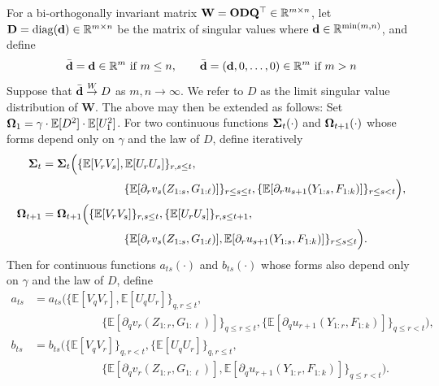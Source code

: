 \documentclass[10pt,reqno]{amsart}
\def\W{\mathbf{W}}
\def\E{\mathbb{E}}
\def\R{\mathbb{R}}
\def\diag{\operatorname{diag}}
\def\toW{\overset{W}{\to}}
\def\bW{{\mathbf{W}}}
\begin{document}
For a bi-orthogonally invariant matrix $\W=\bO\bD\bQ^\top \in \R^{m
\times n}$, let $\bD=\diag(\bd) \in \R^{m \times n}$ be the matrix of singular
values where $\bd \in \R^{\min(m,n)}$, and define
\begin{equation}\label{eq:bard}
\bar{\bd}=\bd \in \R^m \text{ if } m \leq n,
\qquad \bar{\bd}=(\bd,0,\ldots,0) \in \R^m \text{ if } m>n
\end{equation}
Suppose that $\bar\bd \toW D$ as $m,n \to \infty$.
We refer to $D$ as the limit singular value distribution of $\bW$.
The above may then be extended as follows: Set $\bOmega_1=\gamma
\cdot \E[D^2] \cdot \E[U_1^2]$. For two continuous functions $\bm{\Sigma}_t(\cdot)$
and $\bm{\Omega}_{t+1}(\cdot)$ whose forms depend only on $\gamma$ and the law of $D$,
define iteratively
\begin{subequations}\label{eq:rectorthobSigma}
\begin{align}
\bSigma_t&=\bSigma_t\Big(\{\E[V_rV_s],\E[U_rU_s]\}_{r,s \leq t},\nonumber\\
&\hspace{1in}\{\E[\partial_r v_s(Z_{1:s},G_{1:\ell})]\}_{r \leq s \leq t},
\{\E[\partial_r u_{s+1}(Y_{1:s},F_{1:k})]\}_{r \leq s<t}\Big),\\
\bOmega_{t+1}&=\bOmega_{t+1}\Big(\{\E[V_rV_s]\}_{r,s \leq t},
\{\E[U_rU_s]\}_{r,s \leq t+1},\nonumber\\
&\hspace{1in}\{\E[\partial_r v_s(Z_{1:s},G_{1:\ell})],
\E[\partial_r u_{s+1}(Y_{1:s},F_{1:k})]\}_{r \leq s \leq t}\Big).
\end{align}
\end{subequations}
Then for continuous functions $a_{ts}(\cdot)$ and $b_{ts}(\cdot)$ whose forms
also depend only on $\gamma$ and the law of $D$, define
\begin{subequations}\label{eq:rectorthob}
\begin{align}
a_{ts}&=a_{ts}\Big(\{\E[V_qV_r],\E[U_qU_r]\}_{q,r \leq t},\nonumber\\
&\hspace{1in}
\{\E[\partial_q v_r(Z_{1:r},G_{1:\ell})]\}_{q \leq r \leq t},
\{\E[\partial_q u_{r+1}(Y_{1:r},F_{1:k})]\}_{q \leq r<t}\Big),\\
b_{ts}&=b_{ts}\Big(\{\E[V_qV_r]\}_{q,r<t}, \{\E[U_qU_r]\}_{q,r \leq t},\nonumber\\
&\hspace{1in}\{\E[\partial_q v_r(Z_{1:r},G_{1:\ell})],
\E[\partial_q u_{r+1}(Y_{1:r},F_{1:k})]\}_{q \leq r<t}\Big).
\end{align}
\end{subequations}
\end{document}
